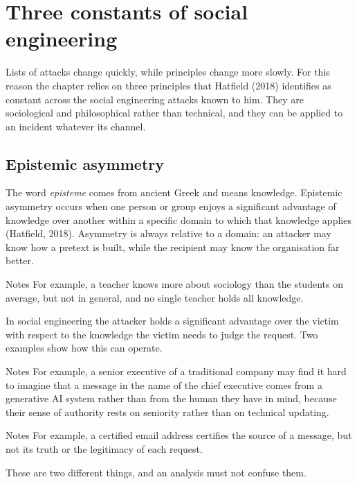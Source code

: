 \section{Three constants of social engineering}
Lists of attacks change quickly, while principles change more slowly. For this reason the chapter relies on three principles that Hatfield (2018) identifies as constant across the social engineering attacks known to him. They are sociological and philosophical rather than technical, and they can be applied to an incident whatever its channel.

\subsection{Epistemic asymmetry}
The word \emph{episteme} comes from ancient Greek and means knowledge. Epistemic asymmetry occurs when one person or group enjoys a significant advantage of knowledge over another within a specific domain to which that knowledge applies (Hatfield, 2018). Asymmetry is always relative to a domain: an attacker may know how a pretext is built, while the recipient may know the organisation far better.

\begin{nota}{Notes}
	For example, a teacher knows more about sociology than the students on average, but not in general, and no single teacher holds all knowledge.
\end{nota}

In social engineering the attacker holds a significant advantage over the victim with respect to the knowledge the victim needs to judge the request. Two examples show how this can operate.

\begin{nota}{Notes}
	For example, a senior executive of a traditional company may find it hard to imagine that a message in the name of the chief executive comes from a generative AI system rather than from the human they have in mind, because their sense of authority rests on seniority rather than on technical updating.
\end{nota}

\begin{nota}{Notes}
	For example, a certified email address certifies the source of a message, but not its truth or the legitimacy of each request.
\end{nota}

These are two different things, and an analysis must not confuse them.

